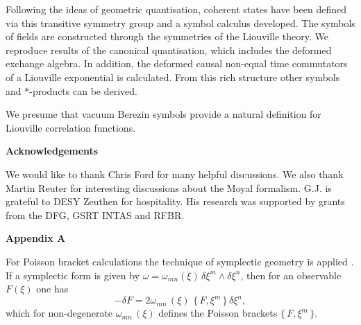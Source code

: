 \documentclass[a4paper,12pt]{article}
\def\theequation{\arabic{section}.\arabic{equation}}
\begin{document}
\noindent
Following the ideas of geometric quantisation, coherent states have
been defined via this transitive symmetry group and a symbol calculus
developed. The symbols of fields are constructed through the
symmetries of the Liouville theory.
We reproduce results of
the canonical quantisation, which includes the deformed exchange
algebra. In addition, the deformed causal non-equal time commutators
of a Liouville exponential is calculated.
From this rich structure other symbols and $*$-products can be derived.

\noindent
We presume that vacuum Berezin symbols provide a natural
definition for Liouville correlation functions.

\vspace{0.8 cm}
\noindent
{\bf {\Large Acknowledgements}}

\vspace{0.3cm}

\noindent
We would like to thank Chris Ford for many helpful discussions.
We also thank Martin Reuter for interesting discussions about
the Moyal formalism.
G.J. is grateful to DESY Zeuthen for hospitality.  His
research was supported by grants from the DFG, GSRT INTAS and RFBR.


\vspace{0.5cm}
\vspace{0.5cm}

\setcounter{equation}{0}
\def\theequation{A.\arabic{equation}}

{\bf {\Large Appendix A}}

\vspace{0.5cm}

\noindent
For Poisson bracket calculations the technique of symplectic geometry
is applied \cite{Woodhouse}.  If a symplectic form is given by
$\omega=\omega_{mn}(\xi)\, \delta \xi^m\wedge\delta\xi^n$, then for
an observable $F(\xi)$ one has
\begin{equation}\label{PB-A}
-\delta F =2\omega_{mn}\,(\xi)\,\,\{\,F,\xi^m\,\}\,\delta\xi^n ,
\end{equation}
which for non-degenerate $\omega_{mn}\,(\xi)$ defines the Poisson brackets
$\{\,F,\xi^m\,\}$.
\end{document}
